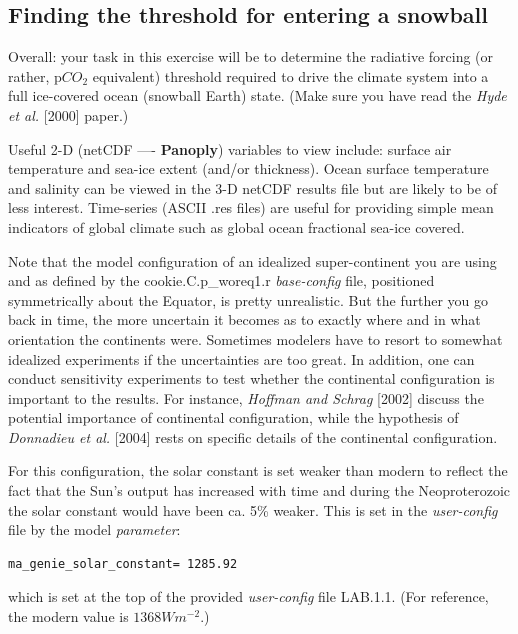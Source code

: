 \newpage

\subsection{Finding the threshold for entering a snowball}

\noindent Overall: your task in this exercise will be to determine the radiative forcing (or rather, p\(CO_{2}\) equivalent) threshold required to drive the climate system into a full ice-covered ocean (snowball Earth) state. (Make sure you have read the \textit{Hyde et al.} [2000] paper.)

Useful 2-D (netCDF —- \textbf{Panoply}) variables to view include: surface air temperature and sea-ice extent (and/or thickness). Ocean surface temperature and salinity can be viewed in the 3-D netCDF results file but are likely to be of less interest. Time-series (ASCII \textsf{\footnotesize .res} files) are useful for providing simple mean indicators of global climate such as global ocean fractional sea-ice covered.

Note that the model configuration of an idealized super-continent you are using and as defined by the \textsf{\footnotesize cookie.C.p\_woreq1.r} \textit{base-config} file, positioned symmetrically about the Equator, is pretty unrealistic. But the further you go back in time, the more uncertain it becomes as to exactly where and in what orientation the continents were. Sometimes modelers have to resort to somewhat idealized experiments if the uncertainties are too great. In addition, one can conduct sensitivity experiments to test whether the continental configuration is important to the results. For instance, \textit{Hoffman and Schrag} [2002] discuss the potential importance of continental configuration, while the hypothesis of \textit{Donnadieu et al.} [2004] rests on specific details of the continental configuration.

For this configuration, the solar constant is set weaker than modern to reflect the fact that the Sun’s output has increased with time and during the Neoproterozoic the solar constant would have been ca. 5\% weaker. This is set in the \textit{user-config} file by the model \textit{parameter}:

\vspace{-1mm}\small\begin{verbatim}
ma_genie_solar_constant= 1285.92
\end{verbatim}\normalsize\vspace{-1mm}
which is set at the top of the provided \textit{user-config} file \textsf{\footnotesize LAB.1.1}. (For reference, the modern value is \( 1368 Wm^{-2}\).)


